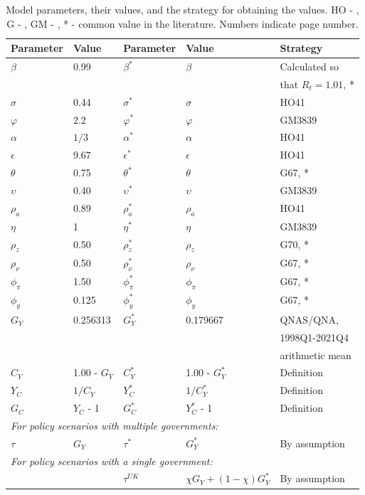 \begin{table}[H] \label{table:model_parameters}
    \centering
    \begin{tabular}{ll|lll}
        Parameter & Value & Parameter & Value & Strategy \\
        \hline
        \hline
        $\beta$ & 0.99 & $\beta^*$ & $\beta$ & Calculated so \\ 
        & & & &that $R_t = 1.01$, *\\
        $\sigma$ & 0.44 & $\sigma^*$ & $\sigma$ & HO41\\
        $\varphi$ & 2.2 & $\varphi^*$ & $\varphi$ & GM3839\\
        $\alpha$ & $1/3$ & $\alpha^*$ & $\alpha$ & HO41\\
        $\epsilon$ & 9.67 & $\epsilon^*$ & $\epsilon$ & HO41\\
        $\theta$ & 0.75 & $\theta^*$ & $\theta$ & G67, *\\
        $\upsilon$ & 0.40 & $\upsilon^*$ & $\upsilon$ & GM3839\\
        $\rho_a$ & 0.89 & $\rho_a^*$ & $\rho_a$ & HO41\\
        $\eta$ & 1 & $\eta^*$ & $\eta$ & GM3839\\
        $\rho_z$ & 0.50 & $\rho_z^*$ & $\rho_z$ & G70, *\\
        $\rho_\nu$ & 0.50 & $\rho^*_\nu$ & $\rho_\nu$ & G67, *\\
        $\phi_\pi$ & 1.50 & $\phi^*_\pi$ & $\phi_\pi$ & G67, *\\
        $\phi_y$ & 0.125 & $\phi^*_y$ & $\phi_y$ & G67, *\\
        $G_Y$ & 0.256313 & $G_Y^*$ & 0.179667 & QNAS/QNA, \\ & & & &1998Q1-2021Q4\\ &&&& arithmetic mean\\
        $C_Y$ & 1.00 - $G_Y$ & $C_Y^*$ & 1.00 - $G_Y^*$ & Definition \\
        $Y_C$ & $1/{C_Y}$ & $Y_C^*$ & $1/{C_Y^*}$ & Definition \\
        $G_C$ & $Y_C$ - 1 & $G_C^*$ & $Y_C^*$ - 1 & Definition \\
        \multicolumn{5}{l}{\textit{For policy scenarios with multiple governments:}} \\
        $\tau$ & $G_Y$ & $\tau^*$ & $G_Y^*$ & By assumption\\
        \multicolumn{5}{l}{\textit{For policy scenarios with a single government:}} \\
         &&$\tau^{UK}$    & $\chi G_Y + (1-\chi)G^*_Y$  & By assumption\\
    \end{tabular}
    \vspace{0.5cm}
    \caption{Model parameters, their values, and the strategy for obtaining the values. HO - \textcite{harrison_2010_evaluating}, G - \textcite{jordigal_2015_monetary}, GM - \textcite{gali_2005_monetary}, * - common value in the literature. Numbers indicate page number.}
\end{table}